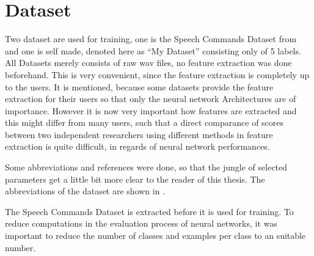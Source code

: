 
\section{Dataset}\label{sec:exp_dataset}
Two dataset are used for training, one is the Speech Commands Dataset from \cite{Warden2018} and one is self made, denoted here as \enquote{My Dataset} consisting only of 5 labels.
All Datasets merely consists of raw wav files, no feature extraction was done beforehand.
This is very convenient, since the feature extraction is completely up to the users.
It is mentioned, because some datasets provide the feature extraction for their users so that only the neural network Architectures are of importance.
However it is now very important how features are extracted and this might differ from many users, such that a direct comparance of scores between two independent researchers using different methods in feature extraction is quite difficult, in regards of neural network performances.

Some abbreviations and references were done, so that the jungle of selected parameters get a little bit more clear to the reader of this thesis.
The abbreviations of the dataset are shown in .

The Speech Commands Dataset is extracted before it is used for training. 
To reduce computations in the evaluation process of neural networks, it was important to reduce the number of classes and examples per class to an suitable number.


